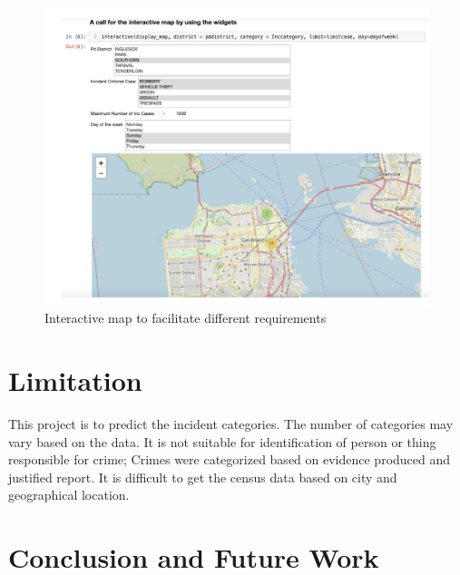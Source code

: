 \documentclass[conference,final,]{IEEEtran}
\begin{document}
\begin{figure}

{\centering \includegraphics[width=0.5\linewidth]{img/fig14b} 

}

\caption{Interactive map to facilitate different requirements}\label{fig:unnamed-chunk-14}
\end{figure}

\section{Limitation}\label{limitation}

This project is to predict the incident categories. The number of
categories may vary based on the data. It is not suitable for
identification of person or thing responsible for crime; Crimes were
categorized based on evidence produced and justified report. It is
difficult to get the census data based on city and geographical
location.

\section{Conclusion and Future Work}\label{conclusion-and-future-work}
\end{document}
